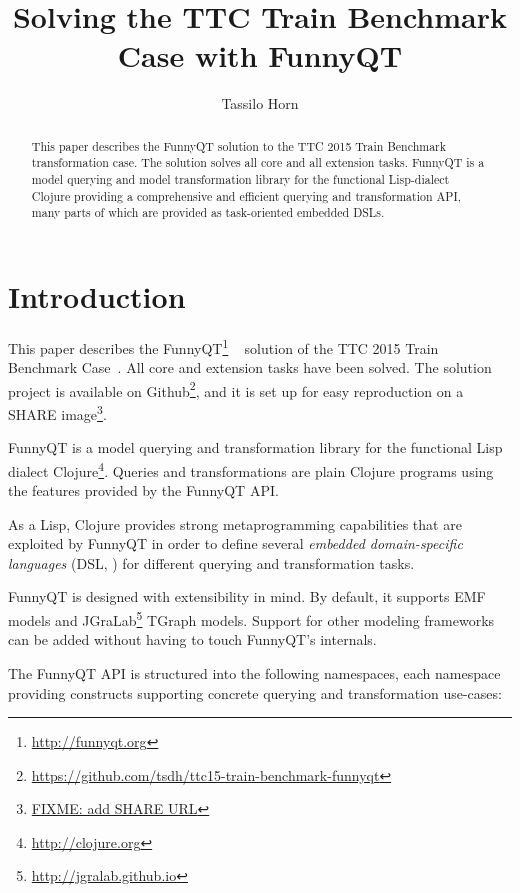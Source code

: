 \documentclass[submission]{eptcs}
\title{Solving the TTC Train Benchmark Case with FunnyQT}
\author{Tassilo Horn
  \institute{Institute for Software Technology, University Koblenz-Landau, Germany}
  \email{horn@uni-koblenz.de}}
\begin{document}
\maketitle

\begin{abstract}
  This paper describes the FunnyQT solution to the TTC 2015 Train Benchmark
  transformation case.  The solution solves all core and all extension tasks.
  FunnyQT is a model querying and model transformation library for the
  functional Lisp-dialect Clojure providing a comprehensive and efficient
  querying and transformation API, many parts of which are provided as
  task-oriented embedded DSLs.
\end{abstract}


\section{Introduction}
\label{sec:introduction}

This paper describes the FunnyQT\footnote{\url{http://funnyqt.org}}
~\cite{Horn2013MQWFQ,funnyqt-icgt15} solution of the TTC 2015 Train Benchmark
Case~\cite{train-benchmark-case-desc}.  All core and extension tasks have been
solved.  The solution project is available on
Github\footnote{\url{https://github.com/tsdh/ttc15-train-benchmark-funnyqt}},
and it is set up for easy reproduction on a SHARE image\footnote{\url{FIXME:
    add SHARE URL}}.

FunnyQT is a model querying and transformation library for the functional Lisp
dialect Clojure\footnote{\url{http://clojure.org}}.  Queries and
transformations are plain Clojure programs using the features provided by the
FunnyQT API.

As a Lisp, Clojure provides strong metaprogramming capabilities that are
exploited by FunnyQT in order to define several \emph{embedded domain-specific
  languages} (DSL, \cite{book:Fowler2010DSL}) for different querying and
transformation tasks.

FunnyQT is designed with extensibility in mind.  By default, it supports EMF
\cite{Steinberg2008EEM} models and
JGraLab\footnote{\url{http://jgralab.github.io}} TGraph models.  Support for
other modeling frameworks can be added without having to touch FunnyQT's
internals.

The FunnyQT API is structured into the following namespaces, each namespace
providing constructs supporting concrete querying and transformation use-cases:
\end{document}
